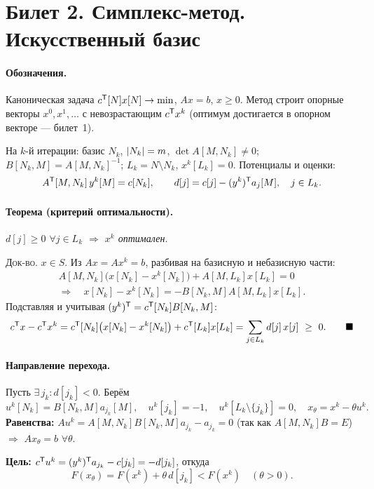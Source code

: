 \section{Билет 2. Симплекс-метод. Искусственный базис}


\paragraph{Обозначения.}
Каноническая задача $c^{\mathsf{T}}[N]x[N] \to \min$, $Ax = b$, $x \ge 0$. Метод строит
опорные векторы $x^0, x^1, \dots$ с невозрастающим $c^{\mathsf{T}} x^k$ (оптимум
достигается в опорном векторе — билет~1).

На $k$-й итерации: базис $N_k$, $\left\lvert N_k \right\rvert = m$, $\det A[M,N_k] \ne 0$;
$B[N_k,M] = A[M,N_k]^{-1}$; $L_k = N \setminus N_k$, $x^k[L_k] = 0$.
Потенциалы и оценки:
\[
  A^{\mathsf{T}}[M,N_k]\,y^k[M] = c[N_k] ,
  \qquad
  d[j] = c[j] - (y^k)^{\mathsf{T}} a_j[M] , \quad j \in L_k .
\]

\paragraph{Теорема (критерий оптимальности).}
\textit{$d[j] \ge 0$ $\forall j \in L_k$ $\Rightarrow$ $x^k$ оптимален.}

\textsc{Док-во.} $x \in S$. Из $Ax = Ax^k = b$, разбивая на базисную и
небазисную части:
\begin{gather*}
  A[M,N_k]\big(x[N_k] - x^k[N_k]\big) + A[M,L_k]x[L_k] = 0 \\
  \Rightarrow\quad x[N_k] - x^k[N_k] = -B[N_k,M]A[M,L_k]x[L_k] .
\end{gather*}
Подставляя и учитывая $(y^k)^{\mathsf{T}} = c^{\mathsf{T}}[N_k]B[N_k,M]$:
\[
  c^{\mathsf{T}} x - c^{\mathsf{T}} x^k
   = c^{\mathsf{T}}[N_k]\big(x[N_k] - x^k[N_k]\big) + c^{\mathsf{T}}[L_k]x[L_k]
   = \sum_{j \in L_k} d[j]\,x[j] \ \ge\ 0 . \qquad \blacksquare
\]

\paragraph{Направление перехода.}
Пусть $\exists\, j_k : d[j_k] < 0$. Берём
\[
  u^k[N_k] = B[N_k,M]a_{j_k}[M] , \quad u^k[j_k] = -1 , \quad
  u^k[L_k \setminus \{j_k\}] = 0 , \quad x_\theta = x^k - \theta u^k .
\]
\textbf{Равенства:} $Au^k = A[M,N_k]B[N_k,M]a_{j_k} - a_{j_k} = 0$ (так как
$A[M,N_k]B = E$) $\Rightarrow$ $Ax_\theta = b$ $\forall\theta$.

\textbf{Цель:} $c^{\mathsf{T}} u^k = (y^k)^{\mathsf{T}} a_{j_k} - c[j_k] = -d[j_k]$, откуда
\[
  F(x_\theta) = F(x^k) + \theta\,d[j_k] < F(x^k) \quad (\theta > 0) .
\]

